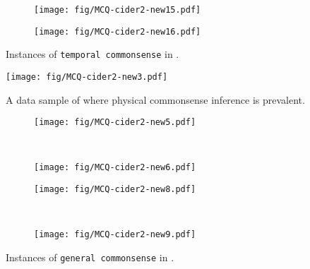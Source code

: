 \begin{figure}[!ht]
\begin{subfigure}[t]{\linewidth}
    \centering
        \texttt{[image: fig/MCQ-cider2-new15.pdf]}
        \caption{}
        \label{fig:mcq15}
\end{subfigure}
\begin{subfigure}[t]{\linewidth}
    \centering
        \texttt{[image: fig/MCQ-cider2-new16.pdf]}
        \caption{}
        \label{fig:mcq16}
\end{subfigure}
\caption{Instances of \texttt{temporal commonsense} in \dataset{}.}
\label{fig:temporal-csk-sup}
\end{figure}

\begin{figure}[t]
    \centering
        \texttt{[image: fig/MCQ-cider2-new3.pdf]}
        \caption{A data sample of \dataset{} where physical commonsense inference is prevalent.}
        \label{fig:mcq3}
\end{figure}

\begin{figure*}[ht]
    \centering
    
\begin{subfigure}[t]{.49\textwidth}
        \texttt{[image: fig/MCQ-cider2-new5.pdf]}
        \caption{}
        \label{fig:mcq5}
\end{subfigure}~
\begin{subfigure}[t]{.49\textwidth}
        \texttt{[image: fig/MCQ-cider2-new6.pdf]}
        \caption{}
        \label{fig:mcq6}
\end{subfigure}

\begin{subfigure}[t]{.49\textwidth}
        \texttt{[image: fig/MCQ-cider2-new8.pdf]}
        \caption{}
        \label{fig:mcq8}
\end{subfigure}~
\begin{subfigure}[t]{.49\textwidth}
        \texttt{[image: fig/MCQ-cider2-new9.pdf]}
        \caption{}
        \label{fig:mcq9}
\end{subfigure}
\caption{Instances of \texttt{general commonsense} in \dataset{}.}
\label{fig:general_csk_sup}
\end{figure*}

